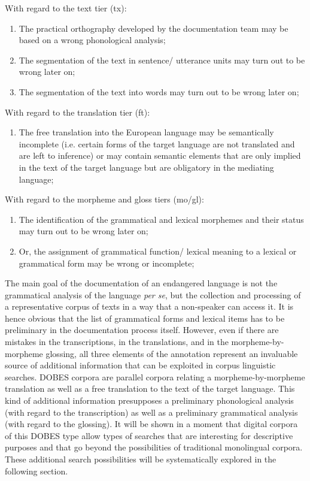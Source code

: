 \ea
 With regard to the text tier (tx):
 \begin{enumerate}
 \item The practical orthography developed by the documentation team may be based on a wrong phonological analysis;

 \item The segmentation of the text in sentence/ utterance units may turn out to be wrong later on;

 \item The segmentation of the text into words may turn out to be wrong later on;

 \end{enumerate}
\z

\ea
 With regard to the translation tier (ft):
 \begin{enumerate}
 \item The free translation into the European language may be semantically incomplete (i.e. certain forms of the target language are not translated and are left to inference) or may contain semantic elements that are only implied in the text of the target language but are obligatory in the mediating language; 
 \end{enumerate}
\z

\ea
 With regard to the morpheme and gloss tiers (mo/gl):
 \begin{enumerate}
 \item The identification of the grammatical and lexical morphemes and their status may turn out to be wrong later on;
 \item Or, the assignment of grammatical function/ lexical meaning to a lexical or grammatical form may be wrong or incomplete;
 \end{enumerate}
\z

The main goal of the documentation of an endangered language is not the grammatical analysis of the language \textit{per se}, but the collection and processing of a representative corpus of texts in a way that a non-speaker can access it. It is hence obvious that the list of grammatical forms and lexical items has to be preliminary in the documentation process itself. However, even if there are mistakes in the transcriptions, in the translations, and in the morpheme-by-morpheme glossing, all three elements of the annotation represent an invaluable source of additional information that can be exploited in corpus linguistic searches. DOBES corpora are parallel corpora relating a morpheme-by-morpheme translation as well as a free translation to the text of the target language. This kind of additional information presupposes a preliminary phonological analysis (with regard to the transcription) as well as a preliminary grammatical analysis (with regard to the glossing). It will be shown in a moment that digital corpora of this DOBES type allow types of searches that are interesting for descriptive purposes and that go beyond the possibilities of traditional monolingual corpora. These additional search possibilities will be systematically explored in the following section.


